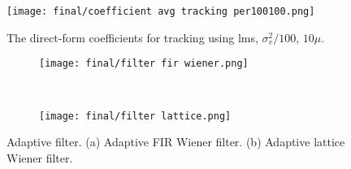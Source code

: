 \documentclass[11pt]{article}
\begin{document}
\begin{figure}[!htbp]
    \centering
    \texttt{[image: final/coefficient avg tracking per100100.png]}
    \caption{The direct-form coefficients for tracking using lms, $\sigma_v^2/100 $, $10\mu$.}
    \label{fig:coefficients tracking per100100}
\end{figure}

\begin{figure}[!htbp]
    \centering
    \begin{subfigure}[b]{0.56\textwidth}
      \texttt{[image: final/filter fir wiener.png]}
      \caption{}
      \label{fig:Adaptive FIR Wiener filter}
    \end{subfigure}%
    \\  %
    \begin{subfigure}[b]{0.8\textwidth}
      \texttt{[image: final/filter lattice.png]}
      \caption{}
      \label{fig:Adaptive lattice Wiener filter}
    \end{subfigure}
    \caption{Adaptive filter. (a) Adaptive FIR Wiener filter. (b) Adaptive lattice Wiener filter.}
    \label{fig:Adaptive filter}
\end{figure}
\end{document}
